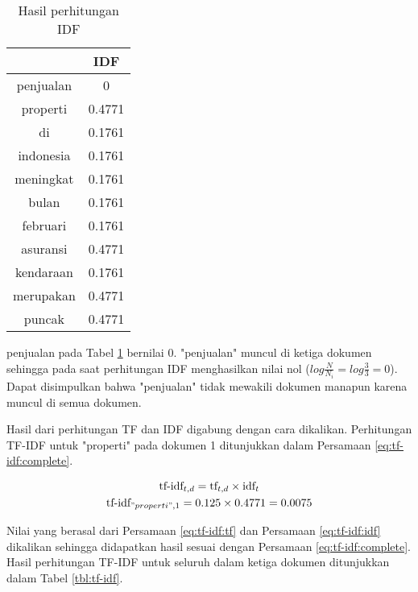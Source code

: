 \begin{table}[H]
	\centering
	\caption{Hasil perhitungan IDF}
	\begin{tabular}{|c|c|} \hline
		\Term & IDF \\ \hline 
        penjualan & 0 \\ \hline
        properti & 0.4771 \\ \hline
        di & 0.1761 \\ \hline
        indonesia & 0.1761 \\ \hline
        meningkat & 0.1761 \\ \hline
        bulan & 0.1761 \\ \hline
        februari & 0.1761 \\ \hline
        asuransi & 0.4771 \\ \hline
        kendaraan & 0.1761 \\ \hline
        merupakan & 0.4771 \\ \hline
        puncak & 0.4771 \\ \hline
	\end{tabular}
	\label{tbl:tf-idf:idf}
\end{table}

\Term penjualan pada Tabel \ref{tbl:tf-idf:idf} bernilai 0. \Term "penjualan" muncul di ketiga dokumen sehingga pada saat perhitungan IDF menghasilkan nilai nol ($log \frac{N}{N_i}=log \frac{3}{3} = 0$). Dapat disimpulkan bahwa \term "penjualan" tidak mewakili dokumen manapun karena muncul di semua dokumen.

Hasil dari perhitungan TF dan IDF digabung dengan cara dikalikan. Perhitungan TF-IDF untuk \term "properti" pada dokumen 1 ditunjukkan dalam Persamaan \ref{eq:tf-idf:complete}.

\begin{equation}
	\label{eq:tf-idf:complete}
	\begin{gathered}
	\textrm{tf-idf}_{t,d} = \textrm{tf}_{t,d} \times \textrm{idf}_t \\
	\textrm{tf-idf}_{"properti",1} = 0.125 \times 0.4771 = 0.0075
	\end{gathered}
\end{equation}

Nilai yang berasal dari Persamaan \ref{eq:tf-idf:tf} dan Persamaan \ref{eq:tf-idf:idf} dikalikan sehingga didapatkan hasil sesuai dengan Persamaan \ref{eq:tf-idf:complete}. Hasil perhitungan TF-IDF untuk seluruh \term dalam ketiga dokumen ditunjukkan dalam Tabel \ref{tbl:tf-idf}.

